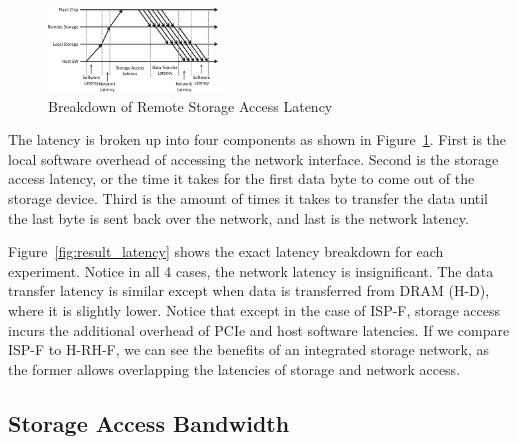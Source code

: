 \begin{figure}[b]
	\centering
	\includegraphics[width=0.40\textwidth]{figures/latencybreak-crop.pdf}
	\caption{Breakdown of Remote Storage Access Latency}
	\label{fig:latencybreak}
\end{figure}

The latency is broken up into four components as shown in Figure~\ref{fig:latencybreak}. First is the local software overhead of accessing the network
interface. Second is the storage access latency, or the time it takes for the
first data byte to come out of the storage device. Third is the amount of times
it takes to transfer the data until the last byte is sent back over the network,
and last is the network latency.

Figure~\ref{fig:result_latency} shows the exact latency breakdown for each experiment. Notice in all 4 cases, the network latency is insignificant. The data transfer latency is similar except when data is transferred from DRAM (H-D), where it is slightly lower. Notice that except in the case of ISP-F, storage access incurs the additional overhead of PCIe and host software latencies. If we compare ISP-F to H-RH-F, we can see the benefits of an integrated storage network, as the former allows overlapping the latencies of storage and network access. 

%
%


\subsection{Storage Access Bandwidth}

